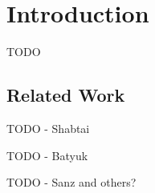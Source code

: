 \section{Introduction}
TODO
\subsection{Related Work}
TODO - Shabtai \cite{shabtai_2010}

TODO - Batyuk \cite{batyuk_2011}

TODO - Sanz \cite{sanz_2012} and others?
